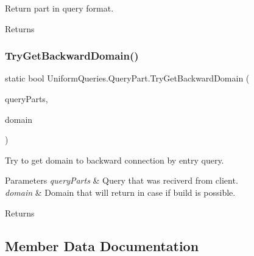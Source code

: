 Return part in query format. 

\begin{DoxyReturn}{Returns}

\end{DoxyReturn}
\mbox{\label{struct_uniform_queries_1_1_query_part_accd3b435809c426dd92456ffee0a996d}} 
\subsubsection{\texorpdfstring{Try\+Get\+Backward\+Domain()}{TryGetBackwardDomain()}}
{\footnotesize\ttfamily static bool Uniform\+Queries.\+Query\+Part.\+Try\+Get\+Backward\+Domain (\begin{DoxyParamCaption}\item[{\mbox{\hyperlink{struct_uniform_queries_1_1_query_part}{Query\+Part}} \mbox{[}$\,$\mbox{]}}]{query\+Parts,  }\item[{out string}]{domain }\end{DoxyParamCaption})\hspace{0.3cm}{\ttfamily [static]}}



Try to get domain to backward connection by entry query. 


\begin{DoxyParams}{Parameters}
{\em query\+Parts} & Query that was reciverd from client.\\
\hline
{\em domain} & Domain that will return in case if build is possible.\\
\hline
\end{DoxyParams}
\begin{DoxyReturn}{Returns}

\end{DoxyReturn}


\subsection{Member Data Documentation}
\mbox{\label{struct_uniform_queries_1_1_query_part_a941540a3d1489c7f32cb5e21910ba7ac}} 
